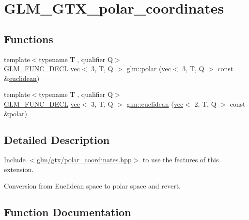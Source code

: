 \hypertarget{group__gtx__polar__coordinates}{}\section{G\+L\+M\+\_\+\+G\+T\+X\+\_\+polar\+\_\+coordinates}
\label{group__gtx__polar__coordinates}
\subsection*{Functions}
\begin{DoxyCompactItemize}
\item 
{\footnotesize template$<$typename T , qualifier Q$>$ }\\\hyperlink{setup_8hpp_ab2d052de21a70539923e9bcbf6e83a51}{G\+L\+M\+\_\+\+F\+U\+N\+C\+\_\+\+D\+E\+CL} \hyperlink{structglm_1_1vec}{vec}$<$ 3, T, Q $>$ \hyperlink{group__gtx__polar__coordinates_gab83ac2c0e55b684b06b6c46c28b1590d}{glm\+::polar} (\hyperlink{structglm_1_1vec}{vec}$<$ 3, T, Q $>$ const \&\hyperlink{group__gtx__polar__coordinates_ga1821d5b3324201e60a9e2823d0b5d0c8}{euclidean})
\item 
{\footnotesize template$<$typename T , qualifier Q$>$ }\\\hyperlink{setup_8hpp_ab2d052de21a70539923e9bcbf6e83a51}{G\+L\+M\+\_\+\+F\+U\+N\+C\+\_\+\+D\+E\+CL} \hyperlink{structglm_1_1vec}{vec}$<$ 3, T, Q $>$ \hyperlink{group__gtx__polar__coordinates_ga1821d5b3324201e60a9e2823d0b5d0c8}{glm\+::euclidean} (\hyperlink{structglm_1_1vec}{vec}$<$ 2, T, Q $>$ const \&\hyperlink{group__gtx__polar__coordinates_gab83ac2c0e55b684b06b6c46c28b1590d}{polar})
\end{DoxyCompactItemize}


\subsection{Detailed Description}
Include $<$\hyperlink{polar__coordinates_8hpp}{glm/gtx/polar\+\_\+coordinates.\+hpp}$>$ to use the features of this extension.

Conversion from Euclidean space to polar space and revert. 

\subsection{Function Documentation}
\mbox{\label{group__gtx__polar__coordinates_ga1821d5b3324201e60a9e2823d0b5d0c8}} 
